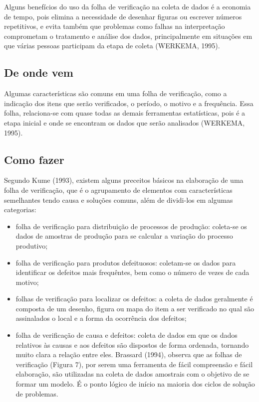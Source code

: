 \documentclass[
]{article}
\begin{document}
Alguns benefícios do uso da folha de verificação na coleta de dados é a economia de tempo, pois elimina a necessidade de desenhar figuras ou escrever números repetitivos, e evita também que problemas como falhas na interpretação comprometam o tratamento e análise dos dados, principalmente em situações em que várias pessoas participam da etapa de coleta (WERKEMA, 1995).

\hypertarget{de-onde-vem-1}{%
\subsection*{De onde vem}\label{de-onde-vem-1}}

Algumas características são comuns em uma folha de verificação, como a indicação dos itens que serão verificados, o período, o motivo e a frequência. Essa folha, relaciona-se com quase todas as demais ferramentas estatísticas, pois é a etapa inicial e onde se encontram os dados que serão analisados (WERKEMA, 1995).

\hypertarget{como-fazer-1}{%
\subsection*{Como fazer}\label{como-fazer-1}}

Segundo Kume (1993), existem alguns preceitos básicos na elaboração de uma folha de verificação, que é o agrupamento de elementos com características semelhantes tendo causa e soluções comuns, além de dividi-los em algumas categorias:

\begin{itemize}
\item
  folha de verificação para distribuição de processos de produção: coleta-se os dados de amostras de produção para se calcular a variação do processo produtivo;
\item
  folha de verificação para produtos defeituosos: coletam-se os dados para identificar os defeitos mais frequêntes, bem como o número de vezes de cada motivo;
\item
  folhas de verificação para localizar os defeitos: a coleta de dados geralmente é composta de um desenho, figura ou mapa do item a ser verificado no qual são assinalados o local e a forma da ocorrência dos defeitos;
\item
  folha de verificação de causa e defeitos: coleta de dados em que os dados relativos às causas e aos defeitos são dispostos de forma ordenada, tornando muito clara a relação entre eles.
  Brassard (1994), observa que as folhas de verificação (Figura 7), por serem uma ferramenta de fácil compreensão e fácil elaboração, são utilizadas na coleta de dados amostrais com o objetivo de se formar um modelo. É o ponto lógico de início na maioria dos ciclos de solução de problemas.
\end{itemize}
\end{document}
